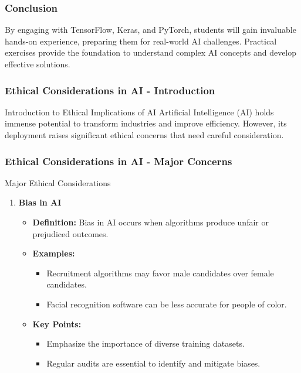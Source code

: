 \documentclass{beamer}
\begin{document}
\begin{frame}
    \frametitle{Conclusion}
    By engaging with TensorFlow, Keras, and PyTorch, students will gain invaluable hands-on experience, preparing them for real-world AI challenges. 
    Practical exercises provide the foundation to understand complex AI concepts and develop effective solutions.
\end{frame}

\begin{frame}[fragile]
    \frametitle{Ethical Considerations in AI - Introduction}
    \begin{block}{Introduction to Ethical Implications of AI}
        Artificial Intelligence (AI) holds immense potential to transform industries and improve efficiency. 
        However, its deployment raises significant ethical concerns that need careful consideration.
    \end{block}
\end{frame}

\begin{frame}[fragile]
    \frametitle{Ethical Considerations in AI - Major Concerns}
    \begin{block}{Major Ethical Considerations}
        \begin{enumerate}
            \item \textbf{Bias in AI}
            \begin{itemize}
                \item \textbf{Definition:} Bias in AI occurs when algorithms produce unfair or prejudiced outcomes.
                \item \textbf{Examples:}
                \begin{itemize}
                    \item Recruitment algorithms may favor male candidates over female candidates.
                    \item Facial recognition software can be less accurate for people of color.
                \end{itemize}
                \item \textbf{Key Points:}
                \begin{itemize}
                    \item Emphasize the importance of diverse training datasets.
                    \item Regular audits are essential to identify and mitigate biases.
                \end{itemize}
            \end{itemize}
        \end{enumerate}
    \end{block}
\end{frame}
\end{document}
